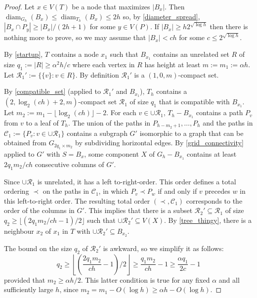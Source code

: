 \documentclass{patmorin}
\DeclareMathOperator{\diam}{diam}
\renewcommand{\le}{\leqslant}
\renewcommand{\ge}{\geqslant}
\begin{document}
\begin{proof}
  Let $x\in V(T)$ be a node that maximizes $|B_x|$.  Then $\diam_{G_h}(B_x)\le\diam_{T_h}(B_x) \le 2h$ so, by \cref{diameter_spread}, $|B_x\cap P_y|\ge |B_x|/(2h+1)$ for some $y\in V(P)$.  If $|B_x|\ge h2^{\sqrt{\log h}}$ then there is nothing more to prove, so we may assume that $|B_x| < ch$ for some $c\le 2^{\sqrt{\log h}}$.

  By \cref{startup}, $T$ contains a node $x_1$ such that $B_{x_1}$ contains an unrelated set $R$ of size $q_1:=|R|\ge \alpha^2 h/c$ where each vertex in $R$ has height at least $m:=m_1:=\alpha h$.  Let  $\mathcal{R}_1':=\{\{v\}:v\in R\}$.  By definition $\mathcal{R}_1'$ is a $(1,0,m)$-compact set.

  By \cref{compatible_set} (applied to $\mathcal{R}_1'$ and $B_{x_1}$), $T_h$ contains a $(2,\log_2(ch)+2,m)$-compact set $\mathcal{R}_1$ of size $q_1$ that is compatible with $B_{x_1}$.  Let $m_2:=m_1-\lfloor\log_2(ch)\rfloor -2$.  For each $v\in\cup\mathcal{R}_1$, $T_h-B_{x_1}$ contains a path $P_v$ from $v$ to a leaf of $T_h$.  The union of the paths in $P_{h-m_2+1},\ldots,P_{h}$ and the paths in $\mathcal{C}_1:=\{P_v:v\in\cup\mathcal{R}_1\}$ contains a subgraph $G'$ isomorphic to a graph that can be obtained from $G_{2q_1\times m_2}$ by subdividing horizontal edges.  By \cref{grid_connectivity} applied to $G'$ with $S=B_x$, some component $X$ of $G_h-B_{x_1}$ contains at least $2q_1m_2/ch$ consecutive columns of $G'$.

  Since $\cup\mathcal{R}_1$ is unrelated, it has a left to-right-order. This order defines a total ordering $\prec$ on the paths in $\mathcal{C}_1$, in which $P_v\prec P_w$ if and only if $v$ precedes $w$ in this left-to-right order. The resulting total order $(\prec,\mathcal{C}_1)$ corresponds to the order of the columns in $G'$.  This implies that there is a subset $\mathcal{R}_2'\subseteq \mathcal{R}_1$ of size $q_2\ge \lfloor(2q_1m_2/ch-1)/2\rfloor$ such that $\cup\mathcal{R}_2'\subseteq V(X)$. By \cref{tree_thingy}, there is a neighbour $x_2$ of $x_1$ in $T$ with $\cup\mathcal{R}_2'\subseteq B_{x_2}$.

  The bound on the size $q_2$ of $\mathcal{R}_2'$ is awkward, so we simplify it as follows:
  \[
    q_2 \ge \left\lfloor\left(\frac{2q_1m_2}{ch} - 1\right) /2 \right\rfloor
        \ge \frac{q_1m_2}{ch} - 1 \ge \frac{\alpha q_1}{2c} - 1
  \]
  provided that $m_2 \ge\alpha h/2$.  This latter condition is true for any fixed $\alpha$ and all sufficiently large $h$, since $m_2 = m_1 - O(\log h) \ge \alpha h - O(\log h)$.


\end{proof}
\end{document}
